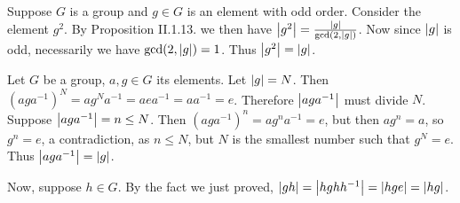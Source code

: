 \begin{solution}
	Suppose $G$ is a group and $g \in G$ is an element with odd order. Consider the element $g^2$. By Proposition II.1.13. we then have $\left|g^2\right| = \frac{\left|g\right|}{\gcd(2, \left|g\right|)}$. Now since $\left|g\right|$ is odd, necessarily we have $\gcd(2, \left|g\right|) = 1$. Thus $\left|g^2\right| = \left|g\right|$.
\end{solution}

\begin{problem}
\end{problem}

\begin{solution}
	Let $G$ be a group, $a, g \in G$ its elements. Let $\left|g\right|=N$. Then $(aga^{-1})^N=ag^Na^{-1}=aea^{-1}=aa^{-1}=e$. Therefore $\left|aga^{-1}\right|$ must divide $N$. Suppose $\left|aga^{-1}\right|=n \leq N$. Then $(aga^{-1})^n=ag^na^{-1}=e$, but then $ag^n=a$, so $g^n=e$, a contradiction, as $n \leq N$, but $N$ is the smallest number such that $g^N = e$. Thus $\left|aga^{-1}\right|=\left|g\right|$. 
	
	Now, suppose $h \in G$. By the fact we just proved, $\left|gh\right| = \left|hghh^{-1}\right| = \left|hge\right| = \left|hg\right|$.
\end{solution}

\begin{problem}
\end{problem}

